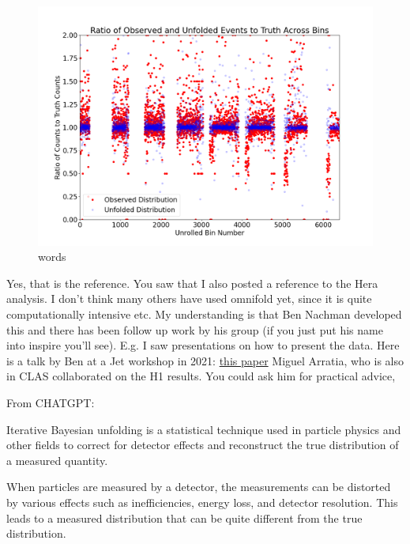     \begin{figure}[ht]
    \centering
    \includegraphics[trim={0 0 0 0},clip,width=\textwidth]{Chapters/Ch5-Further/0_IBU/pics/complete/ratio_of_observed_and_unfolded_events_to_truth_across_bins.png}
    \caption[words]{words}
    \label{fig:ibu3}
    \end{figure}
    
    
   
    
    
    
    Yes, that is the reference. You saw that I also posted a reference to the Hera analysis. I don’t think many others have used omnifold yet, since it is quite computationally intensive etc.
    My understanding is that Ben Nachman developed this and there has been follow up work by his group (if you just put his name into inspire you’ll see). E.g. I saw presentations on how to present the data. Here is a talk by Ben at a Jet workshop in 2021: \href{https://indico.bnl.gov/event/10555/contributions/54721/attachments/37368/61570/H1Measurement_EICWorkshopSeptember2021.pdf}{this paper}
     Miguel Arratia, who is also in CLAS collaborated on the H1 results. You could ask him for practical advice,
    
    From CHATGPT:
    
    
    Iterative Bayesian unfolding is a statistical technique used in particle physics and other fields to correct for detector effects and reconstruct the true distribution of a measured quantity.
    
    When particles are measured by a detector, the measurements can be distorted by various effects such as inefficiencies, energy loss, and detector resolution. This leads to a measured distribution that can be quite different from the true distribution.
    
